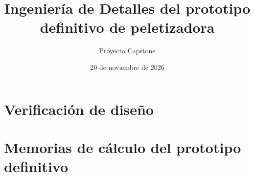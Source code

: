 \documentclass[11pt,a4paper]{article}
\title{Ingeniería de Detalles del prototipo definitivo de peletizadora}
\author{Proyecto Capstone}
\date{20 de noviembre de 2026}
\begin{document}
\maketitle
\section{Verificación de diseño}

\clearpage
\appendix
\section{Memorias de cálculo del prototipo definitivo}



\end{document}
